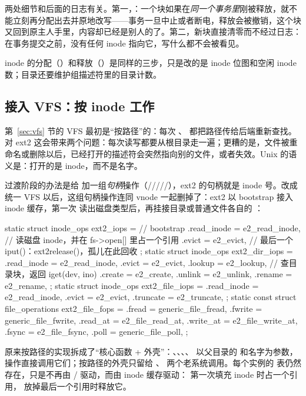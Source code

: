 两处细节和后面的日志有关。第一，：一个块如果在\emph{同一个事务里}刚被释放，就不能立刻再分配出去并原地改写——事务一旦中止或者断电，释放会被撤销，这个块又回到原主人手里，内容却已经是别人的了。第二，新块直接清零而不经过日志：在事务提交之前，没有任何 inode 指向它，写什么都不会被看见。

inode 的分配（）和释放（）是同样的三步，只是改的是 inode 位图和空闲 inode 数；目录还要维护组描述符里的目录计数。

\subsection{接入 VFS：按 inode 工作}

第~\ref{sec:vfs} 节的 VFS 最初是“按路径”的：每次 、 都把路径传给后端重新查找。对 ext2 这会带来两个问题：每次读写都要从根目录走一遍；更糟的是，文件被重命名或删除以后，已经打开的描述符会突然指向别的文件，或者失效。Unix 的语义是：打开的是 inode，而不是名字。

过渡阶段的办法是给  加一组\emph{句柄}操作（/////），ext2 的句柄就是 inode 号。改成统一 VFS 以后，这组句柄操作连同 vnode 一起删掉了：ext2 以 bootstrap  接入 inode 缓存，第一次  读出磁盘类型后，再挂接目录或普通文件各自的 ：

\begin{ccode}
static struct inode_ops ext2_iops = {        // bootstrap
  .read_inode = e2_read_inode,   // 读磁盘 inode，并在 fs->open[] 里占一个引用
  .evict      = e2_evict,        // 最后一个 iput()：ext2release()，孤儿在此回收
};
static struct inode_ops ext2_dir_iops = {
  .read_inode = e2_read_inode, .evict = e2_evict,
  .lookup     = e2_lookup,       // 查目录块，返回 iget(dev, ino)
  .create     = e2_create,  .unlink = e2_unlink,  .rename = e2_rename,
};
static struct inode_ops ext2_file_iops = {
  .read_inode = e2_read_inode, .evict = e2_evict, .truncate = e2_truncate,
};
static const struct file_operations ext2_file_fops = {
  .fread = generic_file_fread, .fwrite = generic_file_fwrite,
  .read_at = e2_file_read_at, .write_at = e2_file_write_at,
  .fsync = e2_file_fsync, .poll = generic_file_poll,
};
\end{ccode}

原来按路径的实现拆成了“核心函数 + 外壳”：、、、、 以父目录的  和名字为参数， 操作直接调用它们；按路径的外壳只留给 、 两个老系统调用。每个实例的  表仍然存在，只是不再由 / 驱动，而由 inode 缓存驱动： 第一次填充 inode 时占一个引用， 放掉最后一个引用时释放它。

